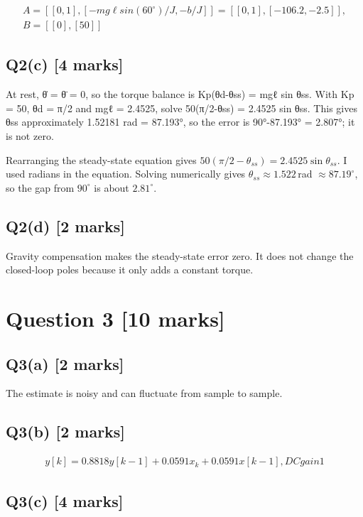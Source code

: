 \documentclass[11pt,a4paper]{article}
\begin{document}
\[\begin{aligned}A = [[0,1], [-mg\ell sin(60^{\circ})/J, -b/J]] = [[0,1], [-106.2, -2.5]],\\ B = [[0],[50]]\end{aligned}\]

\subsection*{Q2(c) \hfill [4 marks]}

At rest, θ̇ = θ̈ = 0, so the torque balance is Kp(θd-θss) = mgℓ sin θss.
With Kp = 50, θd = π/2 and mgℓ = 2.4525, solve 50(π/2-θss) = 2.4525 sin θss.
This gives θss approximately 1.52181 rad = 87.193°, so the error is 90°-87.193° = 2.807°; it is not zero.\par\smallskip Rearranging the steady-state equation gives $50(\pi/2-\theta_{ss})=2.4525\sin\theta_{ss}$. I used radians in the equation. Solving numerically gives $\theta_{ss}\approx1.522\,$rad $\approx87.19^\circ$, so the gap from $90^\circ$ is about $2.81^\circ$.

\subsection*{Q2(d) \hfill [2 marks]}

Gravity compensation makes the steady-state error zero.
It does not change the closed-loop poles because it only adds a constant torque.

\section*{Question 3 \hfill [10 marks]}
\subsection*{Q3(a) \hfill [2 marks]}

The estimate is noisy and can fluctuate from sample to sample.

\subsection*{Q3(b) \hfill [2 marks]}

\[\begin{aligned}y[k]=0.8818y[k-1]+0.0591x_k+0.0591x[k-1], DC gain 1\end{aligned}\]

\subsection*{Q3(c) \hfill [4 marks]}
\end{document}
